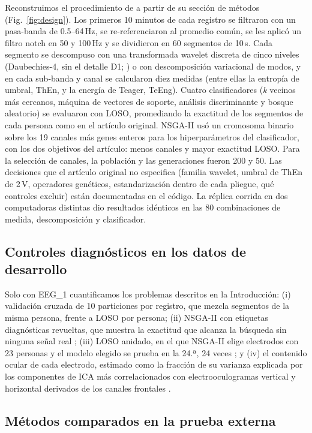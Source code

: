 Reconstruimos el procedimiento de \citet{aljalal2024} a partir de su sección de métodos (Fig.~\ref{fig:design}). Los primeros 10 minutos de cada registro se filtraron con un pasa-banda de 0.5--64\,Hz, se re-referenciaron al promedio común, se les aplicó un filtro notch en 50 y 100\,Hz y se dividieron en 60 segmentos de 10\,s. Cada segmento se descompuso con una transformada wavelet discreta de cinco niveles (Daubechies-4, sin el detalle D1; \citealp{mallat1989}) o con descomposición variacional de modos, y en cada sub-banda y canal se calcularon diez medidas (entre ellas la entropía de umbral, ThEn, y la energía de Teager, TeEng). Cuatro clasificadores (\emph{k} vecinos más cercanos, máquina de vectores de soporte, análisis discriminante y bosque aleatorio) se evaluaron con LOSO, promediando la exactitud de los segmentos de cada persona como en el artículo original. NSGA-II usó un cromosoma binario sobre los 19 canales más genes enteros para los hiperparámetros del clasificador, con los dos objetivos del artículo: menos canales y mayor exactitud LOSO. Para la selección de canales, la población y las generaciones fueron 200 y 50. Las decisiones que el artículo original no especifica (familia wavelet, umbral de ThEn de 2\,\textmu V, operadores genéticos, estandarización dentro de cada pliegue, qué controles excluir) están documentadas en el código. La réplica corrida en dos computadoras distintas dio resultados idénticos en las 80 combinaciones de medida, descomposición y clasificador.

\subsection{Controles diagnósticos en los datos de desarrollo}

Solo con EEG\_1 cuantificamos los problemas descritos en la Introducción: (i) validación cruzada de 10 particiones por registro, que mezcla segmentos de la misma persona, frente a LOSO por persona; (ii) NSGA-II con etiquetas diagnósticas revueltas, que muestra la exactitud que alcanza la búsqueda sin ninguna señal real \citep{ojala2010}; (iii) LOSO anidado, en el que NSGA-II elige electrodos con 23 personas y el modelo elegido se prueba en la 24.ª, 24 veces \citep{varma2006}; y (iv) el contenido ocular de cada electrodo, estimado como la fracción de su varianza explicada por los componentes de ICA más correlacionados con electrooculogramas vertical y horizontal derivados de los canales frontales \citep{jung2000}.

\subsection{Métodos comparados en la prueba externa}

